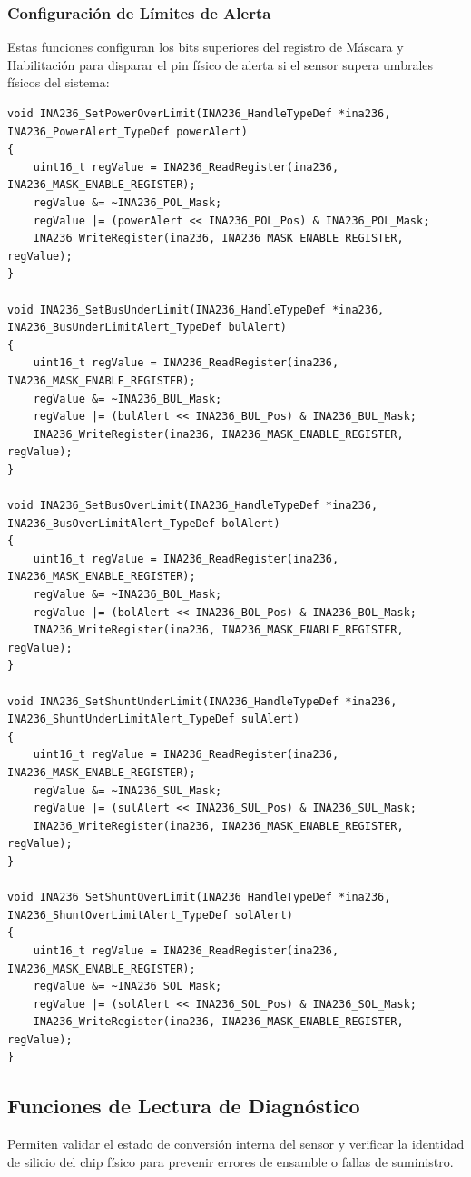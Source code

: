 \documentclass[
10pt, %
a4paper, %
oneside, %
headinclude,footinclude, %
BCOR5mm, %
]{scrartcl}
\begin{document}
\subsubsection{Configuración de Límites de Alerta}
Estas funciones configuran los bits superiores del registro de Máscara y Habilitación para disparar el pin físico de alerta si el sensor supera umbrales físicos del sistema:
\begin{lstlisting}[style=CMakeStyle]
void INA236_SetPowerOverLimit(INA236_HandleTypeDef *ina236, INA236_PowerAlert_TypeDef powerAlert)
{
    uint16_t regValue = INA236_ReadRegister(ina236, INA236_MASK_ENABLE_REGISTER);
    regValue &= ~INA236_POL_Mask;
    regValue |= (powerAlert << INA236_POL_Pos) & INA236_POL_Mask;
    INA236_WriteRegister(ina236, INA236_MASK_ENABLE_REGISTER, regValue);
}

void INA236_SetBusUnderLimit(INA236_HandleTypeDef *ina236, INA236_BusUnderLimitAlert_TypeDef bulAlert)
{
    uint16_t regValue = INA236_ReadRegister(ina236, INA236_MASK_ENABLE_REGISTER);
    regValue &= ~INA236_BUL_Mask;
    regValue |= (bulAlert << INA236_BUL_Pos) & INA236_BUL_Mask;
    INA236_WriteRegister(ina236, INA236_MASK_ENABLE_REGISTER, regValue);
}

void INA236_SetBusOverLimit(INA236_HandleTypeDef *ina236, INA236_BusOverLimitAlert_TypeDef bolAlert)
{
    uint16_t regValue = INA236_ReadRegister(ina236, INA236_MASK_ENABLE_REGISTER);
    regValue &= ~INA236_BOL_Mask;
    regValue |= (bolAlert << INA236_BOL_Pos) & INA236_BOL_Mask;
    INA236_WriteRegister(ina236, INA236_MASK_ENABLE_REGISTER, regValue);
}

void INA236_SetShuntUnderLimit(INA236_HandleTypeDef *ina236, INA236_ShuntUnderLimitAlert_TypeDef sulAlert)
{
    uint16_t regValue = INA236_ReadRegister(ina236, INA236_MASK_ENABLE_REGISTER);
    regValue &= ~INA236_SUL_Mask;
    regValue |= (sulAlert << INA236_SUL_Pos) & INA236_SUL_Mask;
    INA236_WriteRegister(ina236, INA236_MASK_ENABLE_REGISTER, regValue);
}

void INA236_SetShuntOverLimit(INA236_HandleTypeDef *ina236, INA236_ShuntOverLimitAlert_TypeDef solAlert)
{
    uint16_t regValue = INA236_ReadRegister(ina236, INA236_MASK_ENABLE_REGISTER);
    regValue &= ~INA236_SOL_Mask;
    regValue |= (solAlert << INA236_SOL_Pos) & INA236_SOL_Mask;
    INA236_WriteRegister(ina236, INA236_MASK_ENABLE_REGISTER, regValue);
}
\end{lstlisting}

\subsection{Funciones de Lectura de Diagnóstico}
Permiten validar el estado de conversión interna del sensor y verificar la identidad de silicio del chip físico para prevenir errores de ensamble o fallas de suministro.
\end{document}

